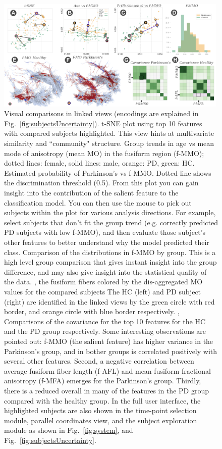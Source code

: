 \begin{figure}[t]
\centering
\includegraphics[width=0.99\textwidth]{images/comparisonV3labeled.png}
\caption{Visual comparisons in linked views (encodings are explained in Fig.~\ref{fig:subjectsUncertainty}).  t-SNE plot using top 10 features with compared subjects highlighted. This view hints at multivariate similarity and ``community" structure.
 Group trends in age vs mean mode of anisotropy (mean MO) in the fusiform region (f-MMO); dotted lines: female, solid lines: male, orange: PD, green: HC.  Estimated probability of Parkinson's vs f-MMO. Dotted line shows the discrimination threshold (0.5). From this plot you can gain insight into the contribution of the salient feature to the classification model. You can then use the mouse to pick out subjects within the plot for various analysis directions. For example, select subjects that don't fit the group trend (e.g. correctly predicted PD subjects with low f-MMO), and then evaluate those subject's other features to better understand why the model predicted their class.  Comparison of the distributions in f-MMO by group. This is a high level group comparison that gives instant insight into the group difference, and may also give insight into the statistical quality of the data. , the fusiform fibers colored by the dis-aggregated MO values for the compared subjects The HC (left) and PD subject (right) are identified in the linked views by the green circle with red border, and orange circle with blue border respectively. , Comparisons of the covariance for the top 10 features for the HC and the PD group respectively. Some interesting observations are pointed out: f-MMO (the salient feature) has higher variance in the Parkinson's group, and in bother groups is correlated positively with several other features. Second, a negative correlation between average fusiform fiber length (f-AFL) and mean fusiform fractional anisotropy (f-MFA) emerges for the Parkinson's group. Thirdly, there is a reduced overall in many of the features in the PD group compared with the healthy group. In the full user interface, the highlighted subjects are also shown in the time-point selection module, parallel coordinates view, and the subject exploration module as shown in Fig.~\ref{fig:system}, and Fig.~\ref{fig:subjectsUncertainty}.}
\label{fig:infovis}
\end{figure}


